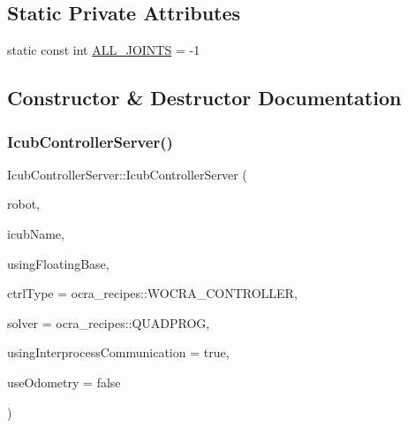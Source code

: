 \subsection*{Static Private Attributes}
\begin{DoxyCompactItemize}
\item 
static const int \hyperlink{classIcubControllerServer_aa977ca558c184e4331121522cc58d2e7}{A\+L\+L\+\_\+\+J\+O\+I\+N\+TS} = -\/1
\end{DoxyCompactItemize}


\subsection{Constructor \& Destructor Documentation}
\hypertarget{classIcubControllerServer_a6b0a6021e3c82e72ac97ad30d3f0c082}{}\label{classIcubControllerServer_a6b0a6021e3c82e72ac97ad30d3f0c082} 
\subsubsection{\texorpdfstring{Icub\+Controller\+Server()}{IcubControllerServer()}}
{\footnotesize\ttfamily Icub\+Controller\+Server\+::\+Icub\+Controller\+Server (\begin{DoxyParamCaption}\item[{std\+::shared\+\_\+ptr$<$ wbi\+::whole\+Body\+Interface $>$}]{robot,  }\item[{std\+::string}]{icub\+Name,  }\item[{const bool}]{using\+Floating\+Base,  }\item[{const ocra\+\_\+recipes\+::\+C\+O\+N\+T\+R\+O\+L\+L\+E\+R\+\_\+\+T\+Y\+PE}]{ctrl\+Type = {\ttfamily ocra\+\_\+recipes\+:\+:WOCRA\+\_\+CONTROLLER},  }\item[{const ocra\+\_\+recipes\+::\+S\+O\+L\+V\+E\+R\+\_\+\+T\+Y\+PE}]{solver = {\ttfamily ocra\+\_\+recipes\+:\+:QUADPROG},  }\item[{const bool}]{using\+Interprocess\+Communication = {\ttfamily true},  }\item[{const bool}]{use\+Odometry = {\ttfamily false} }\end{DoxyParamCaption})}

\hypertarget{classIcubControllerServer_a7582d4bbf9851ee9b58913ea2a89e5fd}{}\label{classIcubControllerServer_a7582d4bbf9851ee9b58913ea2a89e5fd} 
